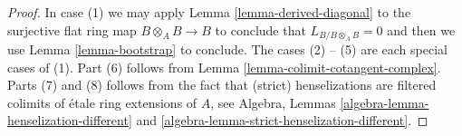 \documentclass[10pt,a4paper]{amsart}
\theoremstyle{plain}
\theoremstyle{definition}
\theoremstyle{remark}
\numberwithin{equation}{subsection}
\begin{document}
\begin{proof}
In case (1) we may apply
Lemma \ref{lemma-derived-diagonal}
to the surjective flat ring map $B \otimes_A B \to B$
to conclude that $L_{B/B \otimes_A B} = 0$ and then we use
Lemma \ref{lemma-bootstrap}
to conclude. The cases (2) -- (5) are each special cases of (1).
Part (6) follows from Lemma \ref{lemma-colimit-cotangent-complex}.
Parts (7) and (8) follows from the fact that (strict) henselizations
are filtered colimits of \'etale ring extensions of $A$, see
Algebra, Lemmas \ref{algebra-lemma-henselization-different} and
\ref{algebra-lemma-strict-henselization-different}.
\end{proof}
\end{document}
